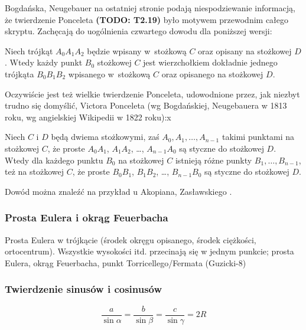 
Bogdańska, Neugebauer \cite[s. 267]{neugebauer_2018} na ostatniej stronie podają niespodziewanie informacją, że twierdzenie Ponceleta {\color{red}\textbf{(TODO: T2.19)}\color{black}} było motywem przewodnim całego skryptu.
Zachęcają do uogólnienia czwartego dowodu dla poniższej wersji:

\begin{theorem}
	Niech trójkąt $A_0 A_1 A_2$ będzie wpisany w~stożkową $C$ oraz opisany na stożkowej $D$.
	Wtedy każdy punkt $B_0$ stożkowej $C$ jest wierzchołkiem dokładnie jednego trójkąta $B_0 B_1 B_2$ wpisanego w~stożkową $C$ oraz opisanego na stożkowej $D$.
\end{theorem}

Oczywiście jest też wielkie twierdzenie Ponceleta, udowodnione przez, jak niezbyt trudno się domyślić, Victora Ponceleta \cite[s. 311-317]{poncelet_1865} (wg Bogdańskiej, Neugebauera w 1813 roku, wg angielskiej Wikipedii w 1822 roku):x

\begin{theorem}
	Niech $C$ i $D$ będą dwiema stożkowymi, zaś $A_0, A_1, \ldots, A_{n-1}$ takimi punktami na stożkowej $C$, że proste $A_0A_1$, $A_1A_2$, \ldots, $A_{n-1}A_0$ są styczne do stożkowej $D$.
	Wtedy dla każdego punktu $B_0$ na stożkowej $C$ istnieją różne punkty $B_1, \ldots, B_{n-1}$, też na stożkowej $C$, że proste $B_0B_1$, $B_1B_2$, \ldots, $B_{n-1}B_0$ są styczne do stożkowej $D$.
\end{theorem}

Dowód można znaleźć na przykład u Akopiana, Zasławskiego \cite[s. 93, 61, 67, 115, 124]{akopyan_2007}.


\subsubsection{Prosta Eulera i okrąg Feuerbacha}
Prosta Eulera w trójkącie (środek okręgu opisanego, środek ciężkości, ortocentrum).
Wszystkie wysokości itd. przecinają się w jednym punkcie; prosta Eulera, okrąg Feuerbacha, punkt Torricellego/Fermata (Guzicki-8)


\subsubsection{Twierdzenie sinusów i cosinusów}

$$\frac{a}{\sin \alpha} = \frac{b}{\sin \beta} = \frac{c}{\sin \gamma} = 2R$$

